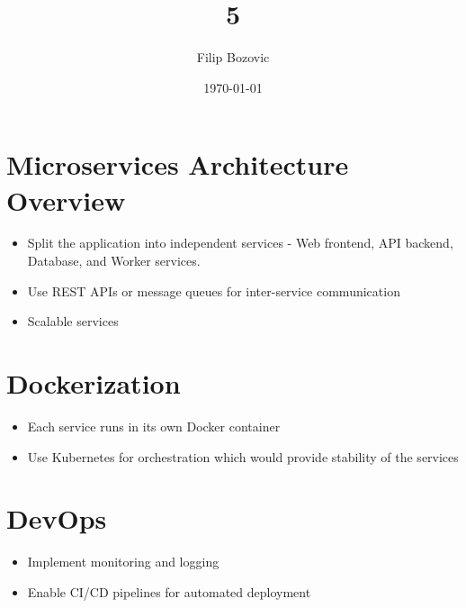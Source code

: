\documentclass[a4paper,12pt]{article}
\title{5}
\author{Filip Bozovic}
\date{\today}
\begin{document}
\maketitle

\section*{Microservices Architecture Overview}
\begin{itemize}
	\item Split the application into independent services - Web frontend, API backend, Database, and Worker services.
	\item Use REST APIs or message queues for inter-service communication
	\item Scalable services
\end{itemize}

\section*{Dockerization}
\begin{itemize}
	\item Each service runs in its own Docker container
	\item Use Kubernetes for orchestration which would provide stability of the services
\end{itemize}

\section*{DevOps}
\begin{itemize}
	\item Implement monitoring and logging
	\item Enable CI/CD pipelines for automated deployment
\end{itemize}
\end{document}
